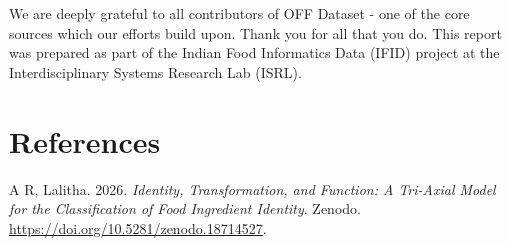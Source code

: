 \documentclass[
  letterpaper,
  DIV=11,
  numbers=noendperiod]{scrartcl}
\newlength{\cslhangindent}
\newenvironment{CSLReferences}[2] %
 {\begin{list}{}{%
  \setlength{\itemindent}{0pt}
  \setlength{\leftmargin}{0pt}
  \setlength{\parsep}{0pt}
  \ifodd #1
   \setlength{\leftmargin}{\cslhangindent}
   \setlength{\itemindent}{-1\cslhangindent}
  \fi
  \setlength{\itemsep}{#2\baselineskip}}}
 {\end{list}}
\begin{document}
We are deeply grateful to all contributors of OFF Dataset - one of the
core sources which our efforts build upon. Thank you for all that you
do. This report was prepared as part of the Indian Food Informatics Data
(IFID) project at the Interdisciplinary Systems Research Lab (ISRL).

\section*{References}\label{references}

\protect{}\label{refs}
\begin{CSLReferences}{1}{1}
A R, Lalitha. 2026. \emph{Identity, {Transformation}, and {Function}: {A
Tri-Axial Model} for the {Classification} of {Food Ingredient
Identity}}. Zenodo. \url{https://doi.org/10.5281/zenodo.18714527}.

\end{CSLReferences}
\end{document}

